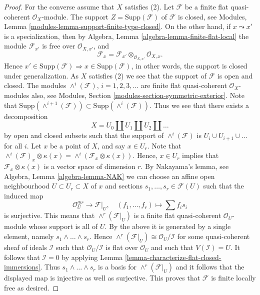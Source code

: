 \begin{proof}
\medskip\noindent
For the converse assume that $X$ satisfies (2).
Let $\mathcal{F}$ be a finite flat quasi-coherent $\mathcal{O}_X$-module.
The support $Z = \text{Supp}(\mathcal{F})$ of $\mathcal{F}$ is closed, see
Modules, Lemma \ref{modules-lemma-support-finite-type-closed}.
On the other hand, if $x \leadsto x'$ is a specialization, then by
Algebra, Lemma \ref{algebra-lemma-finite-flat-local}
the module $\mathcal{F}_{x'}$ is free over $\mathcal{O}_{X, x'}$, and
$$
\mathcal{F}_x =
\mathcal{F}_{x'} \otimes_{\mathcal{O}_{X, x'}} \mathcal{O}_{X, x}.
$$
Hence
$x' \in \text{Supp}(\mathcal{F}) \Rightarrow x \in \text{Supp}(\mathcal{F})$,
in other words, the support is closed under generalization.
As $X$ satisfies (2) we see that the support of $\mathcal{F}$
is open and closed. The modules $\wedge^i(\mathcal{F})$, $i = 1, 2, 3, \ldots$
are finite flat quasi-coherent $\mathcal{O}_X$-modules
also, see
Modules, Section \ref{modules-section-symmetric-exterior}.
Note that
$\text{Supp}(\wedge^{i + 1}(\mathcal{F})) \subset
\text{Supp}(\wedge^i(\mathcal{F}))$.
Thus we see that there exists a decomposition
$$
X = U_0 \amalg U_1 \amalg U_2 \amalg \ldots
$$
by open and closed subsets such that the support of
$\wedge^i(\mathcal{F})$ is $U_i \cup U_{i + 1} \cup \ldots$ for all $i$.
Let $x$ be a point of $X$, and say $x \in U_r$.
Note that
$\wedge^i(\mathcal{F})_x \otimes \kappa(x) =
\wedge^i(\mathcal{F}_x \otimes \kappa(x))$.
Hence, $x \in U_r$ implies that $\mathcal{F}_x \otimes \kappa(x)$
is a vector space of dimension $r$. By Nakayama's lemma, see
Algebra, Lemma \ref{algebra-lemma-NAK}
we can choose an affine open neighbourhood $U \subset U_r \subset X$
of $x$ and sections $s_1, \ldots, s_r \in \mathcal{F}(U)$ such that
the induced map
$$
\mathcal{O}_U^{\oplus r} \longrightarrow \mathcal{F}|_U, \quad
(f_1, \ldots, f_r) \longmapsto \sum f_i s_i
$$
is surjective. This means that
$\wedge^r(\mathcal{F}|_U)$ is a finite flat quasi-coherent
$\mathcal{O}_U$-module whose support is all of $U$.
By the above it is generated by a single element, namely
$s_1 \wedge \ldots \wedge s_r$. Hence
$\wedge^r(\mathcal{F}|_U) \cong \mathcal{O}_U/\mathcal{I}$
for some quasi-coherent sheaf of ideals $\mathcal{I}$
such that $\mathcal{O}_U/\mathcal{I}$ is flat over $\mathcal{O}_U$ and
such that $V(\mathcal{I}) = U$.
It follows that $\mathcal{I} = 0$ by applying
Lemma \ref{lemma-characterize-flat-closed-immersions}.
Thus $s_1 \wedge \ldots \wedge s_r$ is a basis for
$\wedge^r(\mathcal{F}|_U)$ and it follows that the displayed map is injective
as well as surjective. This proves that $\mathcal{F}$ is finite locally free
as desired.
\end{proof}






